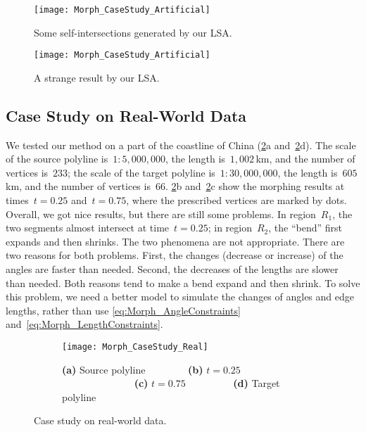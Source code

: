 \begin{figure}[tb]
	\centering	
	\texttt{[image: Morph\_CaseStudy\_Artificial]}
	\caption{Some self-intersections generated by our LSA.}
	\label{fig:Morph_DataComplex}
\par\vspace{\intextsep} %
	\centering	
	\texttt{[image: Morph\_CaseStudy\_Artificial]}
	\caption{A strange result by our LSA.}
	\label{fig:Morph_ExtraVertices}
\end{figure}

\subsection{Case Study on Real-World Data}
\label{sec:Morph_CaseStudy}

We tested our method on a part of the coastline of China 
(\figs\ref{fig:Morph_RealData}a and~\ref{fig:Morph_RealData}d). 
The scale of the source polyline is~$1:5{,}000{,}000$,
the length is~$1{,}002\,$km, 
and the number of vertices is~$233$; 
the scale of the target polyline is~$1:30{,}000{,}000$, 
the length is~$605\,$km, 
and the number of vertices is~$66$. 
%
\figs\ref{fig:Morph_RealData}b and~\ref{fig:Morph_RealData}c
show the morphing results
at times~$t = 0.25$ and~$t = 0.75$,
where the prescribed vertices are marked by dots. 
Overall, we got nice results, 
but there are still some problems. 
In region~$R_{1}$, the two segments almost 
intersect at time~$t = 0.25$; 
in region~$R_{2}$, 
the ``bend'' first expands and then shrinks. 
The two phenomena are not appropriate. 
There are two reasons for both problems. 
First, the changes (decrease or increase) of the angles 
are faster than needed. 
Second, the decreases of the lengths are slower than needed. 
Both reasons tend to make a bend expand and then shrink. 
To solve this problem, we need a better model to 
simulate the changes of angles and edge lengths,
rather than use \eqs\ref{eq:Morph_AngleConstraints}
and~\ref{eq:Morph_LengthConstraints}.

\begin{figure}[tb]
\begin{subfigure}[b]{\textwidth}
	\centering
	\texttt{[image: Morph\_CaseStudy\_Real]}
	\caption{
		\textbf{(a)} Source polyline~~~~~~~~
		\textbf{(b)} $t=0.25$~~~~~~~~~~~~~~
		\textbf{(c)} $t=0.75$~~~~~~~~~
		\textbf{(d)} Target polyline}
\end{subfigure}
\caption{Case study on real-world data.}
\label{fig:Morph_RealData}
\end{figure}

